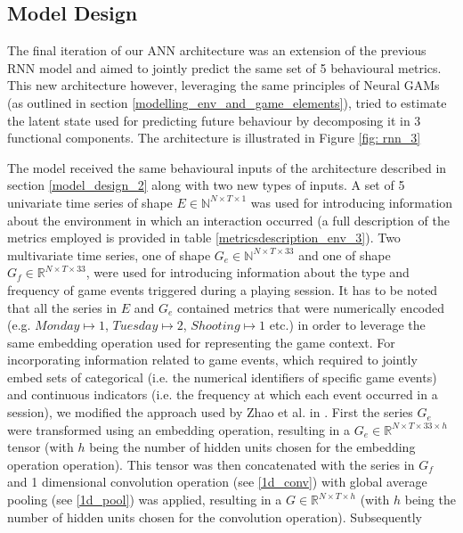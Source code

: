 \subsection{Model Design}
\label{model_design_3}
The final iteration of our ANN architecture was an extension of the previous RNN model and aimed to jointly predict the same set of 5 behavioural metrics. This new architecture however, leveraging the same principles of Neural GAMs (as outlined in section \ref{modelling_env_and_game_elements}), tried to estimate the latent state used for predicting future behaviour by decomposing it in 3 functional components. The architecture is illustrated in Figure \ref{fig: rnn_3}

The model received the same behavioural inputs of the architecture described in section \ref{model_design_2} along with two new types of inputs. A set of 5 univariate time series of shape $E \in \mathbb{N}^{N \times T \times 1}$ was used for introducing information about the environment in which an interaction occurred (a full description of the metrics employed is provided in table \ref{metricsdescription_env_3}). Two multivariate time series, one of shape $G_e \in \mathbb{N}^{N \times T \times 33}$  and one of shape $G_f \in \mathbb{R}^{N \times T \times 33}$, were used for introducing information about the type and frequency of game events triggered during a playing session. It has to be noted that all the series in $E$ and $G_e$ contained metrics that were numerically encoded (e.g. $Monday \mapsto 1$, $Tuesday \mapsto 2$, $Shooting \mapsto 1$ etc.) in order to leverage the same embedding operation used for representing the game context. For incorporating information related to game events, which required to jointly embed sets of categorical (i.e. the numerical identifiers of specific game events) and continuous indicators (i.e. the frequency at which each event occurred in a session), we modified the approach used by Zhao et al. in \cite{zhao2020multi}. First the series $G_e$ were transformed using an embedding operation, resulting in a  $G_e  \in \mathbb{R}^{N \times T \times 33 \times h}$ tensor (with $h$ being the number of hidden units chosen for the embedding operation operation). This tensor was then concatenated with the series in $G_f$ and 1 dimensional convolution operation (see \ref{1d_conv}) with global average pooling (see \ref{1d_pool}) was applied, resulting in a $G  \in \mathbb{R}^{N \times T \times h}$ (with $h$ being the number of hidden units chosen for the convolution operation). Subsequently 


